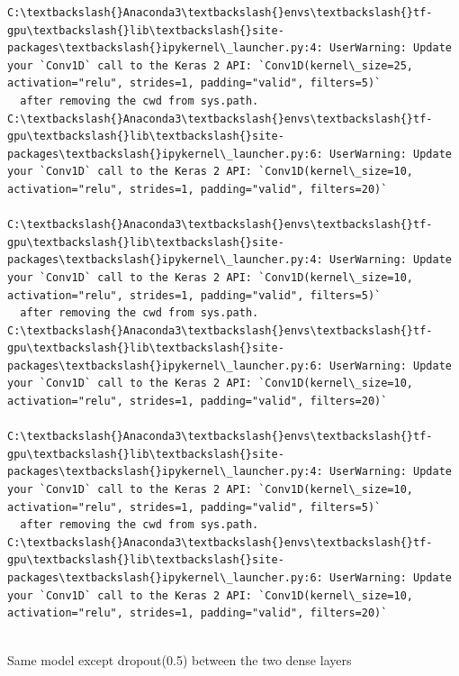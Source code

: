 \documentclass[11pt]{article}
\begin{document}
    \begin{Verbatim}[commandchars=\\\{\}]
C:\textbackslash{}Anaconda3\textbackslash{}envs\textbackslash{}tf-gpu\textbackslash{}lib\textbackslash{}site-packages\textbackslash{}ipykernel\_launcher.py:4: UserWarning: Update your `Conv1D` call to the Keras 2 API: `Conv1D(kernel\_size=25, activation="relu", strides=1, padding="valid", filters=5)`
  after removing the cwd from sys.path.
C:\textbackslash{}Anaconda3\textbackslash{}envs\textbackslash{}tf-gpu\textbackslash{}lib\textbackslash{}site-packages\textbackslash{}ipykernel\_launcher.py:6: UserWarning: Update your `Conv1D` call to the Keras 2 API: `Conv1D(kernel\_size=10, activation="relu", strides=1, padding="valid", filters=20)`
  
C:\textbackslash{}Anaconda3\textbackslash{}envs\textbackslash{}tf-gpu\textbackslash{}lib\textbackslash{}site-packages\textbackslash{}ipykernel\_launcher.py:4: UserWarning: Update your `Conv1D` call to the Keras 2 API: `Conv1D(kernel\_size=10, activation="relu", strides=1, padding="valid", filters=5)`
  after removing the cwd from sys.path.
C:\textbackslash{}Anaconda3\textbackslash{}envs\textbackslash{}tf-gpu\textbackslash{}lib\textbackslash{}site-packages\textbackslash{}ipykernel\_launcher.py:6: UserWarning: Update your `Conv1D` call to the Keras 2 API: `Conv1D(kernel\_size=10, activation="relu", strides=1, padding="valid", filters=20)`
  
C:\textbackslash{}Anaconda3\textbackslash{}envs\textbackslash{}tf-gpu\textbackslash{}lib\textbackslash{}site-packages\textbackslash{}ipykernel\_launcher.py:4: UserWarning: Update your `Conv1D` call to the Keras 2 API: `Conv1D(kernel\_size=10, activation="relu", strides=1, padding="valid", filters=5)`
  after removing the cwd from sys.path.
C:\textbackslash{}Anaconda3\textbackslash{}envs\textbackslash{}tf-gpu\textbackslash{}lib\textbackslash{}site-packages\textbackslash{}ipykernel\_launcher.py:6: UserWarning: Update your `Conv1D` call to the Keras 2 API: `Conv1D(kernel\_size=10, activation="relu", strides=1, padding="valid", filters=20)`
  

    \end{Verbatim}

    Same model except dropout(0.5) between the two dense layers
\end{document}
